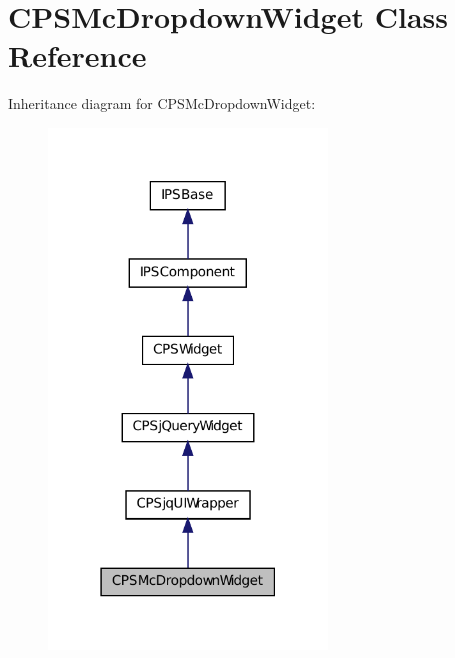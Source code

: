 \hypertarget{classCPSMcDropdownWidget}{
\section{CPSMcDropdownWidget Class Reference}
\label{classCPSMcDropdownWidget}
}


Inheritance diagram for CPSMcDropdownWidget:\nopagebreak
\begin{figure}[H]
\begin{center}
\leavevmode
\includegraphics[width=210pt]{classCPSMcDropdownWidget__inherit__graph}
\end{center}
\end{figure}


